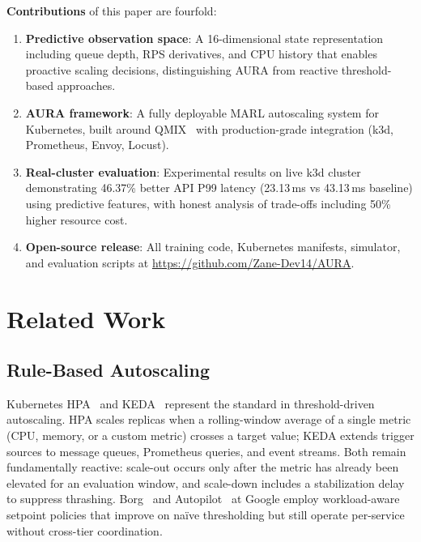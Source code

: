 \documentclass[conference]{IEEEtran}
\begin{document}
\textbf{Contributions} of this paper are fourfold:
\begin{enumerate}
  \item \textbf{Predictive observation space}: A 16-dimensional state
        representation including queue depth, RPS derivatives, and CPU
        history that enables proactive scaling decisions, distinguishing
        AURA from reactive threshold-based approaches.
  \item \textbf{AURA framework}: A fully deployable MARL autoscaling
        system for Kubernetes, built around QMIX~\cite{Rashid2018} with
        production-grade integration (k3d, Prometheus, Envoy, Locust).
  \item \textbf{Real-cluster evaluation}: Experimental results on live
      k3d cluster demonstrating 46.37\% better API P99 latency (23.13\,ms
        vs 43.13\,ms baseline) using predictive features, with honest
        analysis of trade-offs including 50\% higher resource cost.
  \item \textbf{Open-source release}: All training code, Kubernetes
        manifests, simulator, and evaluation scripts at
        \url{https://github.com/Zane-Dev14/AURA}.
\end{enumerate}

\section{Related Work}
\label{sec:related}

\subsection{Rule-Based Autoscaling}

Kubernetes HPA~\cite{KubernetesHPA} and KEDA~\cite{KEDA} represent
the standard in threshold-driven autoscaling. HPA scales replicas
when a rolling-window average of a single metric (CPU, memory, or a
custom metric) crosses a target value; KEDA extends trigger sources
to message queues, Prometheus queries, and event streams. Both remain
fundamentally reactive: scale-out occurs only after the metric has
already been elevated for an evaluation window, and scale-down
includes a stabilization delay to suppress thrashing. Borg~\cite{Verma2015}
and Autopilot~\cite{Rzadca2020} at Google employ workload-aware
setpoint policies that improve on na\"ive thresholding but still
operate per-service without cross-tier coordination.
\end{document}

